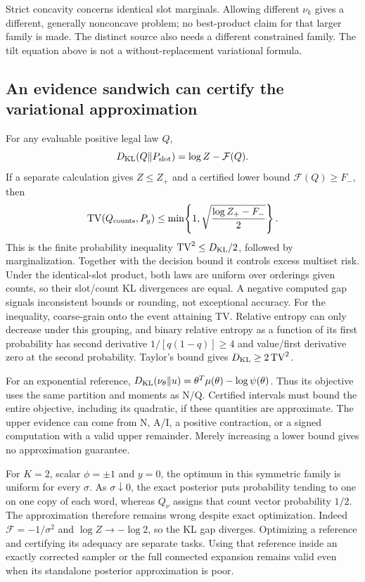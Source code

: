 \documentclass[10pt,a4paper]{article}
\newcommand{\TV}{\operatorname{TV}}
\begin{document}
Strict concavity concerns identical slot marginals. Allowing different $\nu_k$ gives a different,
generally nonconcave problem; no best-product claim for that larger family is made.
The distinct source also needs a different constrained family. The tilt equation above is not a
without-replacement variational formula.

\newpage
\subsection{An evidence sandwich can certify the variational approximation}
For any evaluable positive legal law $Q$,
\[
 D_{\rm KL}(Q\|P_{\rm slot})=\log Z-\mathcal F(Q).
\]
If a separate calculation gives $Z\leq Z_+$ and a certified lower bound
$\mathcal F(Q)\geq F_-$, then
\begin{equation}
 \TV(Q_{\rm counts},P_y)
 \leq\min\!\left\{1,\sqrt{\frac{\log Z_+-F_-}{2}}\right\}.
 \label{eq:variational-certificate}
\end{equation}
This is the finite probability inequality $\TV^2\leq D_{\rm KL}/2$, followed by marginalization.
Together with the decision bound it controls excess multiset risk. Under the identical-slot product,
both laws are uniform over orderings given counts, so their slot/count KL divergences are equal.
A negative computed gap signals inconsistent bounds or rounding, not exceptional accuracy.
For the inequality, coarse-grain onto the event attaining TV. Relative entropy can only decrease under
this grouping, and binary relative entropy as a function of its first probability has second derivative
$1/[q(1-q)]\geq4$ and value/first derivative zero at the second probability. Taylor's bound gives
$D_{\rm KL}\geq2\TV^2$.

For an exponential reference,
$D_{\rm KL}(\nu_\theta\|u)=\theta^T\mu(\theta)-\log\psi(\theta)$.
Thus its objective uses the same partition and moments as N/Q. Certified intervals must bound the entire
objective, including its quadratic, if these quantities are approximate.
The upper evidence can come from N, A/I, a positive contraction, or a signed computation with a valid
upper remainder. Merely increasing a lower bound gives no approximation guarantee.

For $K=2$, scalar $\phi=\pm1$ and $y=0$, the optimum in this symmetric family is uniform for every
$\sigma$. As $\sigma\downarrow0$, the exact posterior puts probability tending to one on one copy of
each word, whereas $Q_\nu$ assigns that count vector probability $1/2$.
The approximation therefore remains wrong despite exact optimization.
Indeed $\mathcal F=-1/\sigma^2$ and $\log Z\to-\log2$, so the KL gap diverges.
Optimizing a reference and certifying its adequacy are separate tasks. Using that reference inside an
exactly corrected sampler or the full connected expansion remains valid even when its standalone
posterior approximation is poor.
\end{document}
